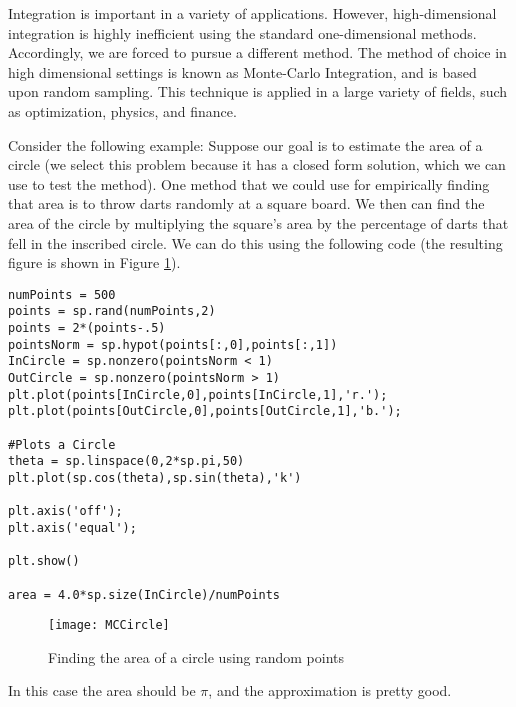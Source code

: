 
Integration is important in a variety of applications. However, high-dimensional integration is highly inefficient using the standard one-dimensional methods. Accordingly, we are forced to pursue a different method. The method of choice in high dimensional settings is known as Monte-Carlo Integration, and is based upon random sampling. This technique is applied in a large variety of fields, such as optimization, physics, and finance.

Consider the following example: Suppose our goal is to estimate the area of a circle (we select this problem because it has a closed form solution, which we can use to test the method). One method that we could use for empirically finding that area is to throw darts randomly at a square board. We then can find the area of the circle by multiplying the square's area by the percentage of darts that fell in the inscribed circle. We can do this using the following code (the resulting figure is shown in Figure \ref{Fig:MCCircle}).


\begin{lstlisting}
numPoints = 500
points = sp.rand(numPoints,2)
points = 2*(points-.5)
pointsNorm = sp.hypot(points[:,0],points[:,1])
InCircle = sp.nonzero(pointsNorm < 1)
OutCircle = sp.nonzero(pointsNorm > 1)
plt.plot(points[InCircle,0],points[InCircle,1],'r.');
plt.plot(points[OutCircle,0],points[OutCircle,1],'b.');

#Plots a Circle
theta = sp.linspace(0,2*sp.pi,50)
plt.plot(sp.cos(theta),sp.sin(theta),'k')

plt.axis('off');
plt.axis('equal');

plt.show()

area = 4.0*sp.size(InCircle)/numPoints

\end{lstlisting}

\begin{figure}[h!]
\begin{center}
\texttt{[image: MCCircle]}
\caption{Finding the area of a circle using random points}
\label{Fig:MCCircle}
\end{center}
\end{figure}

In this case the area should be $\pi$, and the approximation is pretty good.

